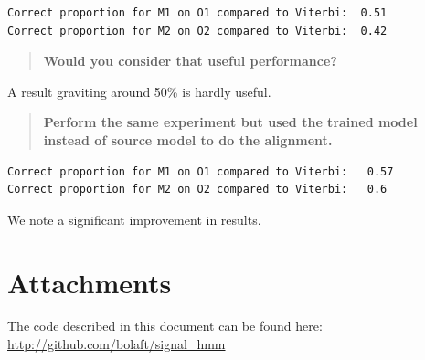 \documentclass[a4paper]{article}
\begin{document}
\begin{lstlisting}
Correct proportion for M1 on O1 compared to Viterbi:  0.51 
Correct proportion for M2 on O2 compared to Viterbi:  0.42 
\end{lstlisting}

\begin{quotation}
\textbf{Would you consider that useful performance?}
\end{quotation}

A result graviting around 50\% is hardly useful.

\begin{quotation}
\textbf{Perform the same experiment but used the trained model instead of source model to do the alignment.}
\end{quotation}

\begin{lstlisting}
Correct proportion for M1 on O1 compared to Viterbi:   0.57 
Correct proportion for M2 on O2 compared to Viterbi:   0.6 
\end{lstlisting}

We note a significant improvement in results.

\section{Attachments}

The code described in this document can be found here: \url{http://github.com/bolaft/signal_hmm}
\end{document}
